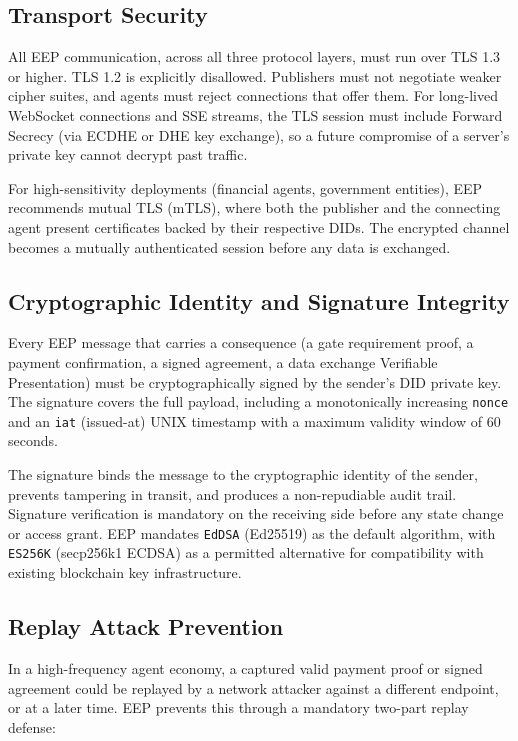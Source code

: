 \documentclass[12pt,a4paper]{article}
\begin{document}
\subsection{Transport Security}

All EEP communication, across all three protocol layers, must run over TLS 1.3 or higher. TLS 1.2 is explicitly disallowed. Publishers must not negotiate weaker cipher suites, and agents must reject connections that offer them. For long-lived WebSocket connections and SSE streams, the TLS session must include Forward Secrecy (via ECDHE or DHE key exchange), so a future compromise of a server's private key cannot decrypt past traffic.

For high-sensitivity deployments (financial agents, government entities), EEP recommends mutual TLS (mTLS), where both the publisher and the connecting agent present certificates backed by their respective DIDs. The encrypted channel becomes a mutually authenticated session before any data is exchanged.

\subsection{Cryptographic Identity and Signature Integrity}

Every EEP message that carries a consequence (a gate requirement proof, a payment confirmation, a signed agreement, a data exchange Verifiable Presentation) must be cryptographically signed by the sender's DID private key. The signature covers the full payload, including a monotonically increasing \texttt{nonce} and an \texttt{iat} (issued-at) UNIX timestamp with a maximum validity window of 60 seconds.

The signature binds the message to the cryptographic identity of the sender, prevents tampering in transit, and produces a non-repudiable audit trail. Signature verification is mandatory on the receiving side before any state change or access grant. EEP mandates \texttt{EdDSA} (Ed25519) as the default algorithm, with \texttt{ES256K} (secp256k1 ECDSA) as a permitted alternative for compatibility with existing blockchain key infrastructure.

\subsection{Replay Attack Prevention}

In a high-frequency agent economy, a captured valid payment proof or signed agreement could be replayed by a network attacker against a different endpoint, or at a later time. EEP prevents this through a mandatory two-part replay defense:
\end{document}

